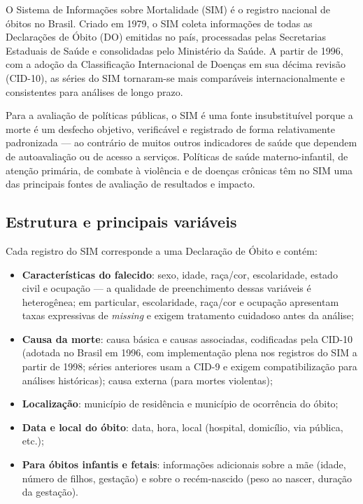 O Sistema de Informações sobre Mortalidade (SIM) é o registro nacional de óbitos no Brasil. Criado em 1979, o SIM coleta informações de todas as Declarações de Óbito (DO) emitidas no país, processadas pelas Secretarias Estaduais de Saúde e consolidadas pelo Ministério da Saúde. A partir de 1996, com a adoção da Classificação Internacional de Doenças em sua décima revisão (CID-10), as séries do SIM tornaram-se mais comparáveis internacionalmente e consistentes para análises de longo prazo.

Para a avaliação de políticas públicas, o SIM é uma fonte insubstituível porque a morte é um desfecho objetivo, verificável e registrado de forma relativamente padronizada --- ao contrário de muitos outros indicadores de saúde que dependem de autoavaliação ou de acesso a serviços. Políticas de saúde materno-infantil, de atenção primária, de combate à violência e de doenças crônicas têm no SIM uma das principais fontes de avaliação de resultados e impacto.

\subsection{Estrutura e principais variáveis}

Cada registro do SIM corresponde a uma Declaração de Óbito e contém:

\begin{itemize}
  \item \textbf{Características do falecido}: sexo, idade, raça/cor, escolaridade, estado civil e ocupação --- a qualidade de preenchimento dessas variáveis é heterogênea; em particular, escolaridade, raça/cor e ocupação apresentam taxas expressivas de \textit{missing} e exigem tratamento cuidadoso antes da análise;
  \item \textbf{Causa da morte}: causa básica e causas associadas, codificadas pela CID-10 (adotada no Brasil em 1996, com implementação plena nos registros do SIM a partir de 1998; séries anteriores usam a CID-9 e exigem compatibilização para análises históricas); causa externa (para mortes violentas);
  \item \textbf{Localização}: município de residência e município de ocorrência do óbito;
  \item \textbf{Data e local do óbito}: data, hora, local (hospital, domicílio, via pública, etc.);
  \item \textbf{Para óbitos infantis e fetais}: informações adicionais sobre a mãe (idade, número de filhos, gestação) e sobre o recém-nascido (peso ao nascer, duração da gestação).
\end{itemize}

